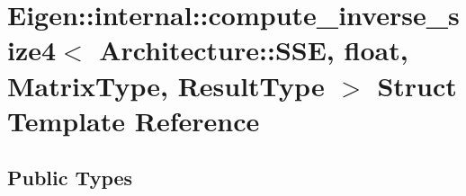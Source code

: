 \hypertarget{struct_eigen_1_1internal_1_1compute__inverse__size4_3_01_architecture_1_1_s_s_e_00_01float_00_011c9f0f9df97321dfc4664a6d9e4a8f31}{}\section{Eigen\+:\+:internal\+:\+:compute\+\_\+inverse\+\_\+size4$<$ Architecture\+:\+:S\+SE, float, Matrix\+Type, Result\+Type $>$ Struct Template Reference}
\label{struct_eigen_1_1internal_1_1compute__inverse__size4_3_01_architecture_1_1_s_s_e_00_01float_00_011c9f0f9df97321dfc4664a6d9e4a8f31}
\subsection*{Public Types}
